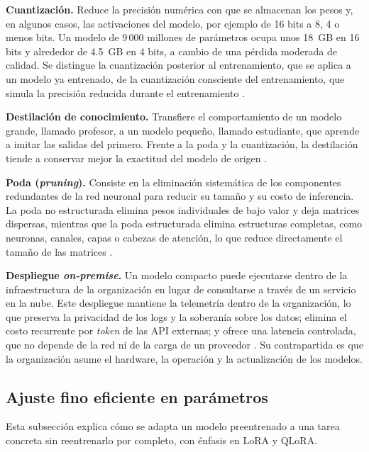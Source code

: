 \textbf{Cuantización.} Reduce la precisión numérica con que se almacenan los pesos y, en algunos casos, las activaciones del modelo, por ejemplo de 16 bits a 8, 4 o menos bits. Un modelo de 9\,000 millones de parámetros ocupa unos 18~GB en 16 bits y alrededor de 4.5~GB en 4 bits, a cambio de una pérdida moderada de calidad. Se distingue la cuantización posterior al entrenamiento, que se aplica a un modelo ya entrenado, de la cuantización consciente del entrenamiento, que simula la precisión reducida durante el entrenamiento \cite{wang2025_slm_survey}.

\textbf{Destilación de conocimiento.} Transfiere el comportamiento de un modelo grande, llamado profesor, a un modelo pequeño, llamado estudiante, que aprende a imitar las salidas del primero. Frente a la poda y la cuantización, la destilación tiende a conservar mejor la exactitud del modelo de origen \cite{yang2025_lightweight}.

\textbf{Poda (\textit{pruning}).} Consiste en la eliminación sistemática de los componentes redundantes de la red neuronal para reducir su tamaño y su costo de inferencia. La poda no estructurada elimina pesos individuales de bajo valor y deja matrices dispersas, mientras que la poda estructurada elimina estructuras completas, como neuronas, canales, capas o cabezas de atención, lo que reduce directamente el tamaño de las matrices \cite{wang2025_slm_survey}.

\textbf{Despliegue \textit{on-premise}.} Un modelo compacto puede ejecutarse dentro de la infraestructura de la organización en lugar de consultarse a través de un servicio en la nube. Este despliegue mantiene la telemetría dentro de la organización, lo que preserva la privacidad de los logs y la soberanía sobre los datos; elimina el costo recurrente por \textit{token} de las API externas; y ofrece una latencia controlada, que no depende de la red ni de la carga de un proveedor \cite{pardeshi2026_smartllm}. Su contrapartida es que la organización asume el hardware, la operación y la actualización de los modelos.

\subsection{Ajuste fino eficiente en parámetros}\label{sec:mt_peft}

Esta subsección explica cómo se adapta un modelo preentrenado a una tarea concreta sin reentrenarlo por completo, con énfasis en LoRA y QLoRA.

